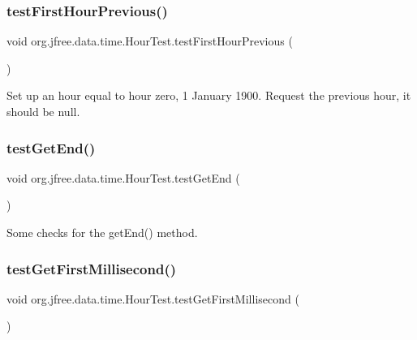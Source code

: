 \subsubsection{\texorpdfstring{test\+First\+Hour\+Previous()}{testFirstHourPrevious()}}
{\footnotesize\ttfamily void org.\+jfree.\+data.\+time.\+Hour\+Test.\+test\+First\+Hour\+Previous (\begin{DoxyParamCaption}{ }\end{DoxyParamCaption})}

Set up an hour equal to hour zero, 1 January 1900. Request the previous hour, it should be null. \mbox{\label{classorg_1_1jfree_1_1data_1_1time_1_1_hour_test_a9977122e7bd82d7c77e3ef5f251ed178}} 
\subsubsection{\texorpdfstring{test\+Get\+End()}{testGetEnd()}}
{\footnotesize\ttfamily void org.\+jfree.\+data.\+time.\+Hour\+Test.\+test\+Get\+End (\begin{DoxyParamCaption}{ }\end{DoxyParamCaption})}

Some checks for the get\+End() method. \mbox{\label{classorg_1_1jfree_1_1data_1_1time_1_1_hour_test_aafae08d96b6080607a76adb4bcab8f97}} 
\subsubsection{\texorpdfstring{test\+Get\+First\+Millisecond()}{testGetFirstMillisecond()}}
{\footnotesize\ttfamily void org.\+jfree.\+data.\+time.\+Hour\+Test.\+test\+Get\+First\+Millisecond (\begin{DoxyParamCaption}{ }\end{DoxyParamCaption})}

